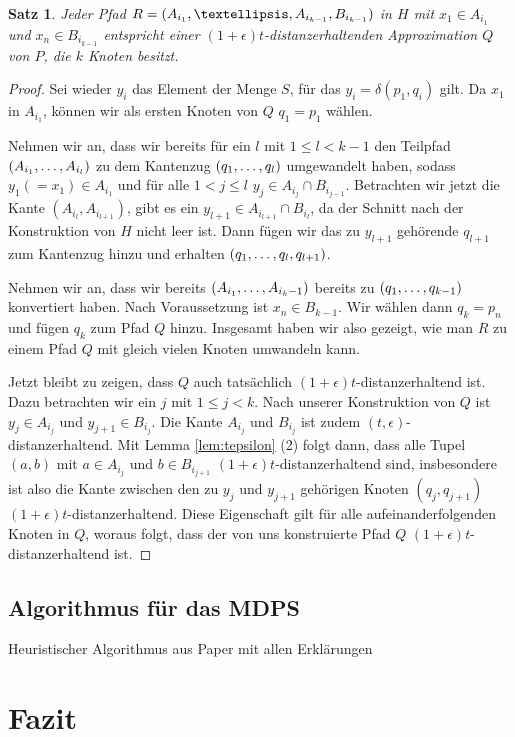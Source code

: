 \documentclass[11pt]{article}
\newtheorem{theorem}{Satz}[section]
\begin{document}
	\begin{theorem}
		\label{theo:H2Approx}
		Jeder Pfad $R = (A_{i_1}, \textellipsis, A_{i_{k-1}}, B_{i_{k-1}})$ in $H$ mit $x_1 \in A_{i_1}$ und $x_n \in B_{i_{k-1}}$ entspricht einer $(1+\epsilon)t$-distanzerhaltenden Approximation $Q$ von $P$, die $k$ Knoten besitzt.
	\end{theorem}
	\begin{proof}
		Sei wieder $y_i$ das Element der Menge $S$, für das $y_i = \delta(p_1, q_i)$ gilt.
		Da $x_1$ in $A_{i_1}$, können wir als ersten Knoten von $Q$ $q_1 = p_1$ wählen.
		
		Nehmen wir an, dass wir bereits für ein $l$ mit $1 \leq l < k-1$ den Teilpfad $(A_{i_1}, \mathellipsis, A_{i_l})$ zu dem Kantenzug $(q_1, \mathellipsis, q_l)$ umgewandelt haben, sodass $y_1 (= x_1) \in A_{i_1}$ und für alle $1 < j \leq l$ $y_j \in A_{i_j} \cap B_{i_{j-1}}$. Betrachten wir jetzt die Kante $(A_{i_l}, A_{i_{l+1}})$, gibt es ein $y_{l+1} \in A_{i_{l+1}} \cap B_{i_l}$, da der Schnitt nach der Konstruktion von $H$ nicht leer ist. Dann fügen wir das zu $y_{l+1}$ gehörende $q_{l+1}$ zum Kantenzug hinzu und erhalten $(q_1, \mathellipsis, q_l, q_{l+1})$.
		
		Nehmen wir an, dass wir bereits $(A_{i_1}, \mathellipsis, A_{i_k-1})$ bereits zu $(q_1, \mathellipsis, q_{k-1})$ konvertiert haben. Nach Voraussetzung ist $x_n \in B_{k-1}$. Wir wählen dann $q_k = p_n$ und fügen $q_k$ zum Pfad $Q$ hinzu. 
		Insgesamt haben wir also gezeigt, wie man $R$ zu einem Pfad $Q$ mit gleich vielen Knoten umwandeln kann. 
		
		Jetzt bleibt zu zeigen, dass $Q$ auch tatsächlich $(1+\epsilon)t$-distanzerhaltend ist.
		Dazu betrachten wir ein $j$ mit $1 \leq j < k$. Nach unserer Konstruktion von $Q$ ist $y_j \in A_{i_j}$ und $y_{j+1} \in B_{i_j}$. Die Kante $A_{i_j}$ und $B_{i_j}$ ist zudem $(t, \epsilon)$-distanzerhaltend. Mit Lemma \ref{lem:tepsilon} (2) folgt dann, dass alle Tupel $(a, b)$ mit $a \in A_{i_j}$ und $b \in B_{i_{j+1}}$ $(1+\epsilon)t$-distanzerhaltend sind, insbesondere ist also die Kante zwischen den zu $y_j$ und $y_{j+1}$ gehörigen Knoten $(q_j, q_{j+1})$ $(1+\epsilon)t$-distanzerhaltend. Diese Eigenschaft gilt für alle aufeinanderfolgenden Knoten in $Q$, woraus folgt, dass der von uns konstruierte Pfad $Q$ $(1+\epsilon)t$-distanzerhaltend ist.
	\end{proof}
    
    \subsection{Algorithmus für das MDPS}
    \label{subsec:mdps}
    Heuristischer Algorithmus aus Paper mit allen Erklärungen

    \section{Fazit}
    \label{sec:fazit}

    
    
\end{document}
